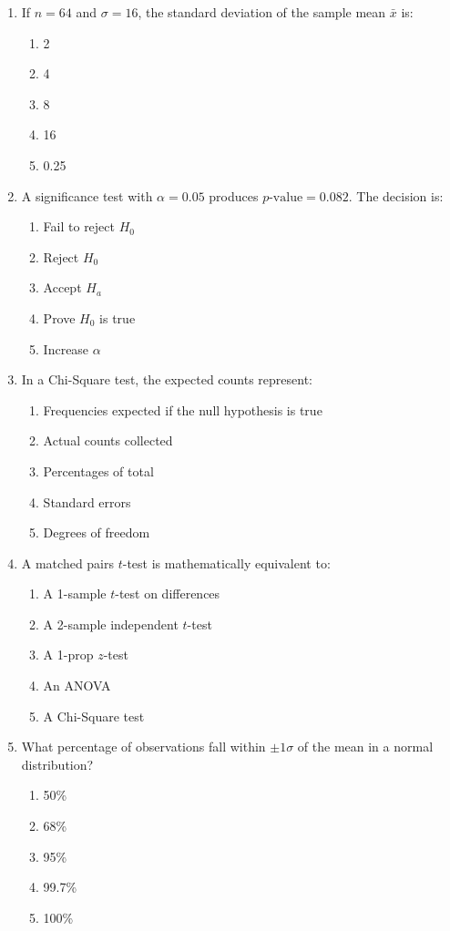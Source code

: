 \begin{enumerate}[resume, leftmargin=1.5em]
  \item If $n = 64$ and $\sigma = 16$, the standard deviation of the sample mean $\bar{x}$ is:
  \begin{enumerate}[label=(\Alph*)]
    \item 2 \item 4 \item 8 \item 16 \item 0.25
  \end{enumerate}

  \item A significance test with $\alpha = 0.05$ produces $p\text{-value} = 0.082$. The decision is:
  \begin{enumerate}[label=(\Alph*)]
    \item Fail to reject $H_0$ \item Reject $H_0$ \item Accept $H_a$ \item Prove $H_0$ is true \item Increase $\alpha$
  \end{enumerate}

  \item In a Chi-Square test, the expected counts represent:
  \begin{enumerate}[label=(\Alph*)]
    \item Frequencies expected if the null hypothesis is true \item Actual counts collected \item Percentages of total \item Standard errors \item Degrees of freedom
  \end{enumerate}

  \item A matched pairs $t$-test is mathematically equivalent to:
  \begin{enumerate}[label=(\Alph*)]
    \item A 1-sample $t$-test on differences \item A 2-sample independent $t$-test \item A 1-prop $z$-test \item An ANOVA \item A Chi-Square test
  \end{enumerate}

  \item What percentage of observations fall within $\pm 1\sigma$ of the mean in a normal distribution?
  \begin{enumerate}[label=(\Alph*)]
    \item 50\% \item 68\% \item 95\% \item 99.7\% \item 100\%
  \end{enumerate}


\end{enumerate}
